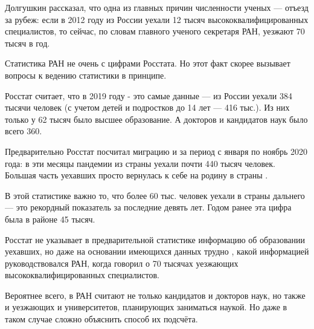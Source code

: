 Долгушкин рассказал, что одна из главных причин  численности ученых --- отъезд за рубеж: если в 2012 году из России уехали 12 тысяч высококвалифицированных специалистов, то сейчас, по словам главного ученого секретаря РАН, уезжают 70 тысяч в год.

Статистика РАН не очень  с цифрами Росстата. Но этот факт скорее вызывает вопросы к ведению статистики в принципе.

Росстат считает, что в 2019 году - это самые  данные --- из России уехали 384 тысячи человек (с учетом детей и подростков до 14 лет --- 416 тыс.). Из них только у 62 тысяч было высшее образование. А докторов и кандидатов наук было всего 360.

Предварительно Росстат посчитал миграцию и за период с января по ноябрь 2020 года: в эти месяцы пандемии из страны уехали почти 440 тысяч человек. Большая часть уехавших просто вернулась к себе на родину в страны .


В этой статистике важно то, что более 60 тыс. человек уехали в страны дальнего  --- это рекордный показатель за последние девять лет. Годом ранее эта цифра была в районе 45 тысяч.

Росстат не указывает в предварительной статистике информацию об образовании уехавших, но даже на основании имеющихся данных трудно , какой информацией руководствовался РАН, когда говорил о 70 тысячах уезжающих высококвалифицированных специалистов.

Вероятнее всего, в РАН считают не только кандидатов и докторов наук, но также и уезжающих  и  университетов, планирующих заниматься наукой. Но даже в таком случае сложно объяснить способ их подсчёта.


